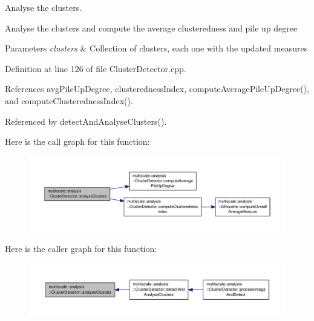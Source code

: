 Analyse the clusters. 

Analyse the clusters and compute the average clusteredness and pile up degree


\begin{DoxyParams}{Parameters}
{\em clusters} & Collection of clusters, each one with the updated measures \\
\hline
\end{DoxyParams}


Definition at line 126 of file Cluster\-Detector.\-cpp.



References avg\-Pile\-Up\-Degree, clusteredness\-Index, compute\-Average\-Pile\-Up\-Degree(), and compute\-Clusteredness\-Index().



Referenced by detect\-And\-Analyse\-Clusters().



Here is the call graph for this function\-:\nopagebreak
\begin{figure}[H]
\begin{center}
\leavevmode
\includegraphics[width=350pt]{classmultiscale_1_1analysis_1_1ClusterDetector_af994e960ba3cd76cc67e714ea276264a_cgraph}
\end{center}
\end{figure}




Here is the caller graph for this function\-:\nopagebreak
\begin{figure}[H]
\begin{center}
\leavevmode
\includegraphics[width=350pt]{classmultiscale_1_1analysis_1_1ClusterDetector_af994e960ba3cd76cc67e714ea276264a_icgraph}
\end{center}
\end{figure}


